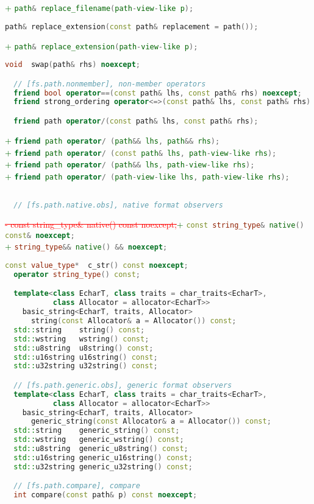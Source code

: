 \documentclass[11pt]{article}
\newcommand{\code}[2][cpp]{\lstinline[language=#1,basicstyle=\small\ttfamily]{#2}}
\newcommand{\tsreplace}[3]{\textcolor{red}{\sout{#1}}#2\textcolor{darkgreen}{#3}}
\begin{document}
\tsreplace{}{}{+ \code{path& replace_filename(path-view-like p);}}
\begin{lstlisting}[language=cpp]
  path& replace_extension(const path& replacement = path());
\end{lstlisting}
\tsreplace{}{}{+ \code{path& replace_extension(path-view-like p);}}
\begin{lstlisting}[language=cpp]
  void  swap(path& rhs) noexcept;

  // [fs.path.nonmember], non-member operators
  friend bool operator==(const path& lhs, const path& rhs) noexcept;
  friend strong_ordering operator<=>(const path& lhs, const path& rhs) noexcept;

  friend path operator/(const path& lhs, const path& rhs);
\end{lstlisting}
\tsreplace{}{}{+ \code{friend path operator/ (path&& lhs, path&& rhs);}}\\
\tsreplace{}{}{+ \code{friend path operator/ (const path& lhs, path-view-like rhs);}}\\
\tsreplace{}{}{+ \code{friend path operator/ (path&& lhs, path-view-like rhs);}}\\
\tsreplace{}{}{+ \code{friend path operator/ (path-view-like lhs, path-view-like rhs);}}
\begin{lstlisting}[language=cpp]

  // [fs.path.native.obs], native format observers
\end{lstlisting}
\tsreplace{- const string_type& native() const noexcept;}{}{+ \code{const string_type& native() const& noexcept;}}\\
\tsreplace{}{}{+ \code{string_type&& native() && noexcept;}}\\
\begin{lstlisting}[language=cpp]
  const value_type*  c_str() const noexcept;
  operator string_type() const;

  template<class EcharT, class traits = char_traits<EcharT>,
           class Allocator = allocator<EcharT>>
    basic_string<EcharT, traits, Allocator>
      string(const Allocator& a = Allocator()) const;
  std::string    string() const;
  std::wstring   wstring() const;
  std::u8string  u8string() const;
  std::u16string u16string() const;
  std::u32string u32string() const;

  // [fs.path.generic.obs], generic format observers
  template<class EcharT, class traits = char_traits<EcharT>,
           class Allocator = allocator<EcharT>>
    basic_string<EcharT, traits, Allocator>
      generic_string(const Allocator& a = Allocator()) const;
  std::string    generic_string() const;
  std::wstring   generic_wstring() const;
  std::u8string  generic_u8string() const;
  std::u16string generic_u16string() const;
  std::u32string generic_u32string() const;

  // [fs.path.compare], compare
  int compare(const path& p) const noexcept;
\end{lstlisting}
\end{document}
